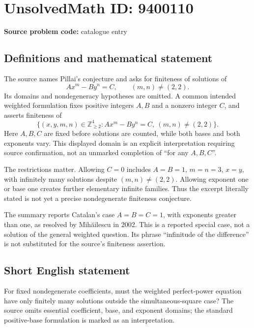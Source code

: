 \documentclass[11pt]{article}
\newcommand{\Z}{\mathbb{Z}}
\begin{document}
\section*{UnsolvedMath ID: 9400110}
\textbf{Source problem code:} catalogue entry
\subsection{Definitions and mathematical statement}
The source names Pillai's conjecture and asks for finiteness of solutions of
\[
 Ax^m-By^n=C,\qquad(m,n)\ne(2,2).
\]
Its domains and nondegeneracy hypotheses are omitted. A common intended weighted formulation fixes positive integers \(A,B\) and a nonzero integer \(C\), and asserts finiteness of
\[
 \{(x,y,m,n)\in\Z_{\geq2}^4:
 Ax^m-By^n=C,\ (m,n)\ne(2,2)\}.
\]
Here \(A,B,C\) are fixed before solutions are counted, while both bases and both exponents vary. This displayed domain is an explicit interpretation requiring source confirmation, not an unmarked completion of ``for any \(A,B,C\)''.

The restrictions matter. Allowing \(C=0\) includes \(A=B=1\), \(m=n=3\), \(x=y\), with infinitely many solutions despite \((m,n)\ne(2,2)\). Allowing exponent one or base one creates further elementary infinite families. Thus the excerpt literally stated is not yet a precise nondegenerate finiteness conjecture.

The summary reports Catalan's case \(A=B=C=1\), with exponents greater than one, as resolved by Mih\u{a}ilescu in 2002. This is a reported special case, not a solution of the general weighted question. Its phrase ``infinitude of the difference'' is not substituted for the source's finiteness assertion.
\subsection{Short English statement}
For fixed nondegenerate coefficients, must the weighted perfect-power equation have only finitely many solutions outside the simultaneous-square case? The source omits essential coefficient, base, and exponent domains; the standard positive-base formulation is marked as an interpretation.
\end{document}
